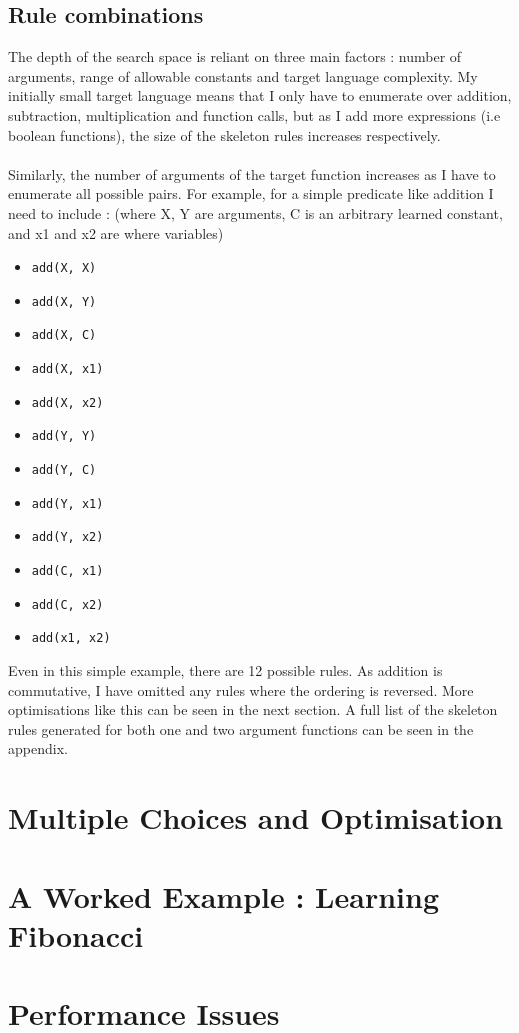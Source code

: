 \subsection{Rule combinations}
The depth of the search space is reliant on three main factors : number of arguments, range of allowable constants and target language complexity. My initially small target language means that I only have to enumerate over addition, subtraction, multiplication and function calls, but as I add more expressions (i.e boolean functions), the size of the skeleton rules increases respectively. \\ \\
Similarly, the number of arguments of the target function increases as I have to enumerate all possible pairs. For example, for a simple predicate like addition I need to include : (where X, Y are arguments, C is an arbitrary learned constant, and x1 and x2 are where variables) 

\begin{multicols}{2}
\begin{itemize}
\item \lstinline{add(X, X)}
\item \lstinline{add(X, Y)}
\item \lstinline{add(X, C)}
\item \lstinline{add(X, x1)}
\item \lstinline{add(X, x2)}
\item \lstinline{add(Y, Y)}
\item \lstinline{add(Y, C)}
\item \lstinline{add(Y, x1)}
\item \lstinline{add(Y, x2)}
\item \lstinline{add(C, x1)}
\item \lstinline{add(C, x2)}
\item \lstinline{add(x1, x2)}
\end{itemize}
\end{multicols}

Even in this simple example, there are 12 possible rules. As addition is commutative, I have omitted any rules where the ordering is reversed. More optimisations like this can be seen in the next section.
A full list of the skeleton rules generated for both one and two argument functions can be seen in the appendix.

\section{Multiple Choices and Optimisation}

\section{A Worked Example : Learning Fibonacci}

\section{Performance Issues}
\pagebreak
%
%